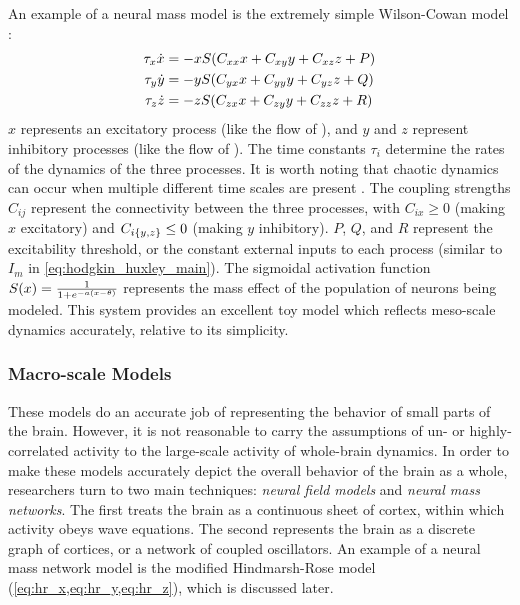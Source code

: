 An example of a neural mass model is the extremely simple Wilson-Cowan model \cite{Wang2012}:
\begin{align}
  \label{eq:wc_x}
  \tau_{x} \dot{x}
  &=
    -x S \pqty{C_{x x} x + C_{x y} y + C_{x z} z + P} \\
  \label{eq:wc_y}
  \tau_{y} \dot{y}
  &=
    -y S \pqty{C_{y x} x + C_{y y} y + C_{y z} z + Q} \\
  \label{eq:wc_z}
  \tau_{z} \dot{z}
  &=
    -z S \pqty{C_{z x} x + C_{z y} y + C_{z z} z + R}
\end{align}
$x$ represents an excitatory process (like the flow of ), and $y$ and $z$ represent inhibitory processes (like the flow of ).
The time constants $\tau_{i}$ determine the rates of the dynamics of the three processes.
It is worth noting that chaotic dynamics can occur when multiple different time scales are present \cite{Breakspear2017}.
The coupling strengths $C_{i j}$ represent the connectivity between the three processes, with $C_{i x} \geq 0$ (making $x$ excitatory) and $C_{i \Bqty{y, z}} \leq 0$ (making $y$ inhibitory).
$P$, $Q$, and $R$ represent the excitability threshold, or the constant external inputs to each process (similar to $I_{m}$ in \cref{eq:hodgkin_huxley_main}).
The sigmoidal activation function $S(x) = \frac{1}{1 + e^{-a \pqty{x - \theta}}}$ represents the mass effect of the population of neurons being modeled.
This system provides an excellent toy model which reflects meso-scale dynamics accurately, relative to its simplicity.

\subsubsection{Macro-scale Models}
\label{sec:intro_seizures_neuroanatomy_macro_scale}
These models do an accurate job of representing the behavior of small parts of the brain.
However, it is not reasonable to carry the assumptions of un- or highly-correlated activity to the large-scale activity of whole-brain dynamics.
In order to make these models accurately depict the overall behavior of the brain as a whole, researchers turn to two main techniques: \textit{neural field models} and \textit{neural mass networks}.
The first treats the brain as a continuous sheet of cortex, within which activity obeys wave equations.
The second represents the brain as a discrete graph of cortices, or a network of coupled oscillators.
An example of a neural mass network model is the modified Hindmarsh-Rose model (\cref{eq:hr_x,eq:hr_y,eq:hr_z}), which is discussed later.

